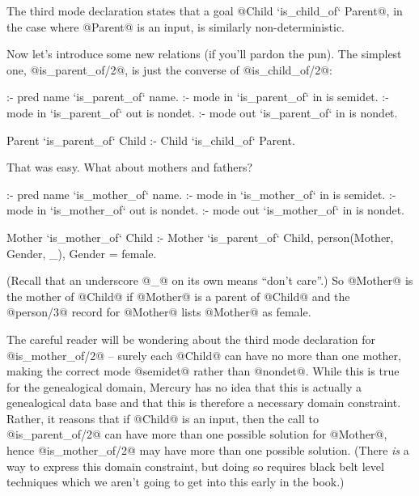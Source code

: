 The third mode declaration states that a goal @Child `is_child_of` Parent@,
in the case where @Parent@ is an input, is similarly non-deterministic.

Now let's introduce some new relations (if you'll pardon the pun).  The
simplest one, @is_parent_of/2@, is just the converse of @is_child_of/2@:
\begin{myverbatim}
:- pred name `is_parent_of` name.
:- mode in   `is_parent_of` in  is semidet.
:- mode in   `is_parent_of` out is nondet.
:- mode out  `is_parent_of` in  is nondet.

Parent `is_parent_of` Child :- Child `is_child_of` Parent.
\end{myverbatim}
That was easy.  What about mothers and fathers?
\begin{myverbatim}
:- pred name `is_mother_of` name.
:- mode in   `is_mother_of` in  is semidet.
:- mode in   `is_mother_of` out is nondet.
:- mode out  `is_mother_of` in  is nondet.

Mother `is_mother_of` Child :-
    Mother `is_parent_of` Child,
    person(Mother, Gender, _),
    Gender = female.
\end{myverbatim}
(Recall that an underscore @_@ on its own means ``don't care''.) So @Mother@
is the mother of @Child@ if @Mother@ is a parent of @Child@ and the
@person/3@ record for @Mother@ lists @Mother@ as female.

The careful reader will be wondering about the third mode declaration for
@is_mother_of/2@ -- surely each @Child@ can have no more than one mother,
making the correct mode @semidet@ rather than @nondet@.  While this is true
for the genealogical domain, Mercury has no idea that this is actually a
genealogical data base and that this is therefore a necessary domain
constraint.  Rather, it reasons that if @Child@ is an input, then the call
to @is_parent_of/2@ can have more than one possible solution for @Mother@,
hence @is_mother_of/2@ may have more than one possible solution.  (There
\emph{is} a way to express this domain constraint, but doing so requires
black belt level techniques which we aren't going to get into this early in
the book.)

